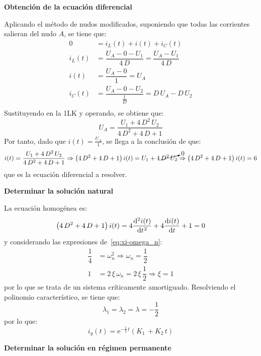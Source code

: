 \begin{example}
  \textbf{Obtención de la ecuación diferencial}
	    
  Aplicando el método de nudos modificados, suponiendo que todas las
  corrientes salieran del nudo $A$, se tiene que:
  \begin{align*}
    0&=i_L(t)+i(t)+i_C(t)\\
    i_L(t)&=\dfrac{U_A-0-U_1}{4\,D}=\dfrac{U_A-U_1}{4\,D}\\
    i(t)&=\dfrac{U_A-0}{1}=U_A\\
    i_C(t)&=\dfrac{U_A-0-U_2}{\frac{1}{D}}=D\,U_A-D\,U_2\\
  \end{align*}
  Sustituyendo en la 1LK y operando, se obtiene que:
  \begin{equation*}
    U_A=\dfrac{U_1+4\,D^2\,U_2}{4\,D^2+4\,D+1}
  \end{equation*}
  Por tanto, dado que $i(t)=\frac{U_A}{1}$, se llega a la conclusión
  de que:
  \begin{equation*}
    i(t)=\dfrac{U_1+4\,D^2\,U_2}{4\,D^2+4\,D+1}\Rightarrow \left(4\,D^2+4\,D+1\right) i(t)=U_1+4\,\cancelto{0}{D^2\,U_2}\Rightarrow \left(4\,D^2+4\,D+1\right) i(t)=6
  \end{equation*}
  que es la ecuación diferencial a resolver.
	    
  \textbf{Determinar la solución natural}
	    
  La ecuación homogénea es:
  \begin{equation*}
    \left(4\,D^2+4\,D+1\right) i(t)=4\diff[2]{i(t)}{t}+4\diff{i(t)}{t}+1=0
  \end{equation*}
  y considerando las expresiones de~\eqref{eq:xi-omega_n}:
  \begin{align*}
    \dfrac{1}{4}&=\omega_n^2\Rightarrow \omega_n=\dfrac{1}{2}\\
    1&=2\,\xi\,\omega_n=2\,\xi\,\dfrac{1}{2}\Rightarrow \xi = 1
  \end{align*}
  por lo que se trata de un sistema críticamente
  amortiguado. Resolviendo el polinomio característico, se tiene que:
  \begin{equation*}
    \lambda_1=\lambda_2=\lambda=-\dfrac{1}{2}
  \end{equation*}
  por lo que:
  \begin{equation*}
    i_g(t)=\mathrm{e}^{-\frac{1}{2}\,t}(K_1\,+K_2\,t) 
  \end{equation*}
	    
  \textbf{Determinar la solución en régimen permanente}
	    

\end{example}
